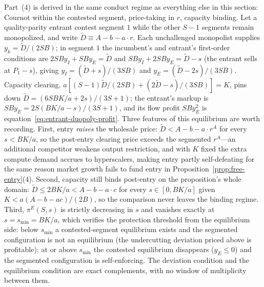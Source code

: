 \documentclass[11pt]{article}
\begin{document}
Part~(4) is derived in the same conduct regime as everything else in this section: Cournot within the contested segment, price-taking in $r$, capacity binding. Let a quality-parity entrant contest segment $1$ while the other $S-1$ segments remain monopolized, and write $\tilde D\equiv A-b-a\cdot r$. Each unchallenged monopolist supplies $y_k=\tilde D/(2SB)$; in segment $1$ the incumbent's and entrant's first-order conditions are $2SBy_I+SBy_E=\tilde D$ and $SBy_I+2SBy_E=\tilde D-s$ (the entrant sells at $P_1-s$), giving $y_I=(\tilde D+s)/(3SB)$ and $y_E=(\tilde D-2s)/(3SB)$. Capacity clearing, $a\left[(S-1)\tilde D/(2SB)+(2\tilde D-s)/(3SB)\right]=K$, pins down $\tilde D=(6SBK/a+2s)/(3S+1)$; the entrant's markup is $SBy_E=2S(BK/a-s)/(3S+1)$, and its flow profit $SBy_E^{2}$ is equation~\eqref{eq:entrant-duopoly-profit}. Three features of this equilibrium are worth recording. First, entry \emph{raises} the wholesale price: $\tilde D<A-b-a\cdot r^{A}$ for every $s<BK/a$, so the post-entry clearing price exceeds the segmented $r^{A}$---an additional competitor weakens output restriction, and with $K$ fixed the extra compute demand accrues to hyperscalers, making entry partly self-defeating for the same reason market growth fails to fund entry in Proposition~\ref{prop:free-entry}(4). Second, capacity still binds post-entry on the proposition's whole domain: $\tilde D\leq2BK/a<A-b-a\cdot c$ for every $s\in[0,BK/a]$ given $K<a(A-b-ac)/(2B)$, so the comparison never leaves the binding regime. Third, $\pi^{E}(S,s)$ is strictly decreasing in $s$ and vanishes exactly at $s=s_{\min}=BK/a$, which verifies the protection threshold from the equilibrium side: below $s_{\min}$ a contested-segment equilibrium exists and the segmented configuration is not an equilibrium (the undercutting deviation priced above is profitable); at or above $s_{\min}$ the contested equilibrium disappears ($y_E\leq0$) and the segmented configuration is self-enforcing. The deviation condition and the equilibrium condition are exact complements, with no window of multiplicity between them.
\end{document}
